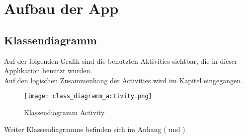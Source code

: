 \newpage
\section{Aufbau der App}


\subsection{Klassendiagramm}  

Auf der folgenden Grafik sind die benutzten Aktivities sichtbar, die in dieser Applikation benutzt wurden.\\
Auf den logischen Zusammenhang der Activities wird im Kapitel  eingegangen. \\

\begin{figure}[h!]
\label{fig:class_diagramm_activity}
\centering
\texttt{[image: class\_diagramm\_activity.png]} 
\caption{Klassendiagramm Activity}
\end{figure}

Weiter Klassendiagramme befinden sich im Anhang ( und )